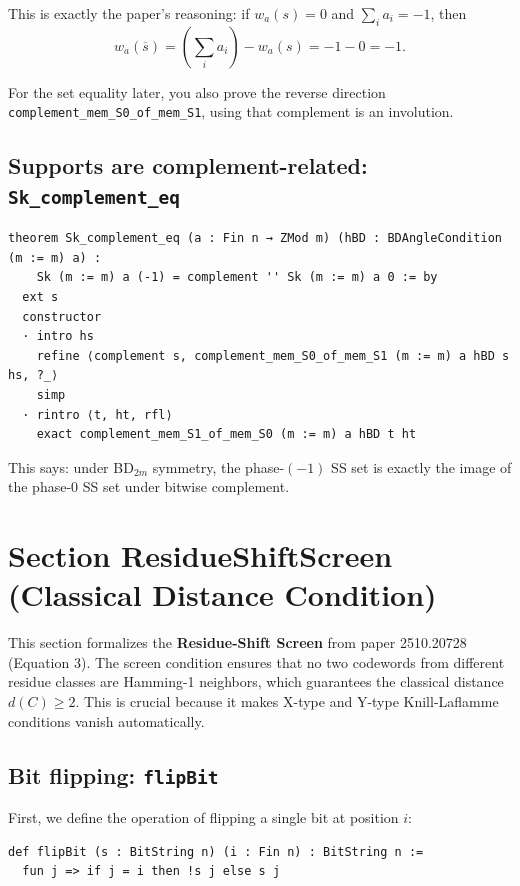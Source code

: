 \documentclass[11pt]{article}
\begin{document}
This is exactly the paper's reasoning:
if $w_a(s)=0$ and $\sum_i a_i = -1$, then
\[
w_a(\overline{s}) = \left(\sum_i a_i\right) - w_a(s) = -1 - 0 = -1.
\]

For the set equality later, you also prove the reverse direction
\texttt{complement\_mem\_S0\_of\_mem\_S1}, using that complement is an involution.

\subsection*{Supports are complement-related: \texttt{Sk\_complement\_eq}}

\begin{lstlisting}
theorem Sk_complement_eq (a : Fin n → ZMod m) (hBD : BDAngleCondition (m := m) a) :
    Sk (m := m) a (-1) = complement '' Sk (m := m) a 0 := by
  ext s
  constructor
  · intro hs
    refine ⟨complement s, complement_mem_S0_of_mem_S1 (m := m) a hBD s hs, ?_⟩
    simp
  · rintro ⟨t, ht, rfl⟩
    exact complement_mem_S1_of_mem_S0 (m := m) a hBD t ht
\end{lstlisting}

This says: under BD$_{2m}$ symmetry, the phase-$(-1)$ SS set is exactly the image of the phase-$0$ SS set under bitwise complement.

\section*{Section ResidueShiftScreen (Classical Distance Condition)}

This section formalizes the \textbf{Residue-Shift Screen} from paper 2510.20728 (Equation 3).
The screen condition ensures that no two codewords from different residue classes are Hamming-1 neighbors,
which guarantees the classical distance $d(C) \geq 2$.
This is crucial because it makes X-type and Y-type Knill-Laflamme conditions vanish automatically.

\subsection*{Bit flipping: \texttt{flipBit}}

First, we define the operation of flipping a single bit at position $i$:

\begin{lstlisting}
def flipBit (s : BitString n) (i : Fin n) : BitString n :=
  fun j => if j = i then !s j else s j
\end{lstlisting}
\end{document}

